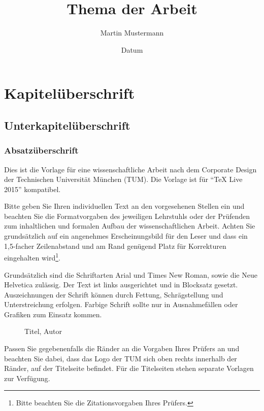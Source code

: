 \documentclass[%
    fontsize=11pt, %
    twoside=off %
]{tumthesis} %
\begin{document}
\title{Thema der Arbeit}
\author{Martin Mustermann}
\date{Datum}

\renewcommand{\Thema}{Thema der Arbeit (optional)}

\tableofcontents %

\chapter{Kapitelüberschrift}

\section{Unterkapitelüberschrift}

\subsection[]{Absatzüberschrift}

Dies ist die Vorlage für eine wissenschaftliche Arbeit nach dem Corporate
Design der Technischen Universität München (TUM). Die Vorlage ist für "`TeX
Live 2015"' kompatibel.

Bitte geben Sie Ihren individuellen Text an den vorgesehenen Stellen ein und
beachten Sie die Formatvorgaben des jeweiligen Lehrstuhls oder der Prüfenden
zum inhaltlichen und formalen Aufbau der wissenschaftlichen Arbeit. Achten Sie
grundsätzlich auf ein angenehmes Erscheinungsbild für den Leser und dass ein
1,5-facher Zeilenabstand und am Rand genügend Platz für Korrekturen
eingehalten wird\footnote{Bitte beachten Sie die Zitationsvorgaben Ihres
Prüfers.}.

Grundsätzlich sind die Schriftarten Arial und Times New Roman, sowie die Neue
Helvetica zulässig. Der Text ist links ausgerichtet und in Blocksatz gesetzt.
Auszeichnungen der Schrift können durch Fettung, Schrägstellung und
Unterstreichung erfolgen. Farbige Schrift sollte nur in Ausnahmefällen oder
Grafiken zum Einsatz kommen.

\begin{figure}[!ht]
\caption{Titel, Autor}
\end{figure}

\clearpage

Passen Sie gegebenenfalls die Ränder an die Vorgaben Ihres Prüfers an und
beachten Sie dabei, dass das Logo der TUM sich oben rechts innerhalb der
Ränder, auf der Titelseite befindet. Für die Titelseiten stehen separate
Vorlagen zur Verfügung.
\end{document}
